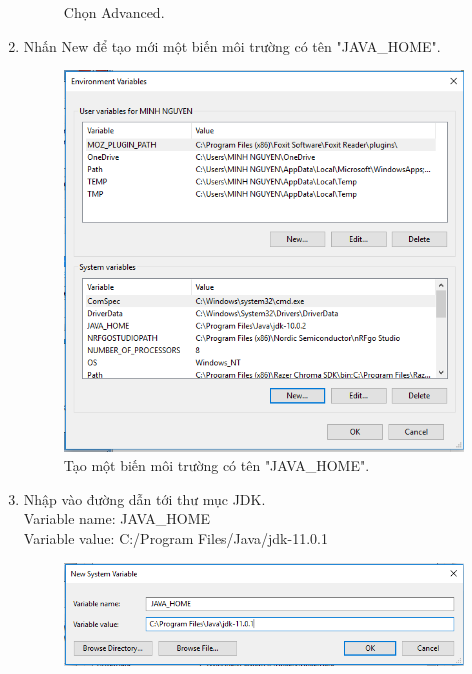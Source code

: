 \begin{enumerate}
\begin{center}
\begin{figure}[htp]
\begin{center}
    \end{center}
    \caption{Chọn Advanced.}
    \label{refhinh1}
    \end{figure}
\end{center}
\newpage
    \item Nhấn New để tạo mới một biến môi trường có tên "JAVA\_HOME".
\begin{center}
    \begin{figure}[htp]
    \begin{center}
     \includegraphics[scale=0.5]{image3/newjava}
    \end{center}
    \caption{Tạo một biến môi trường có tên "JAVA\_HOME".}
    \label{refhinh1}
    \end{figure}
\end{center}
\newpage
    \item Nhập vào đường dẫn tới thư mục JDK.\\
    Variable name: JAVA\_HOME\\
    Variable value: \textsf{C:/Program Files/Java/jdk-11.0.1}
\begin{center}
    \begin{figure}[htp]
    \begin{center}
     \includegraphics[scale=0.5]{image3/javahome}

\end{center}
\end{figure}
\end{center}
\end{enumerate}

